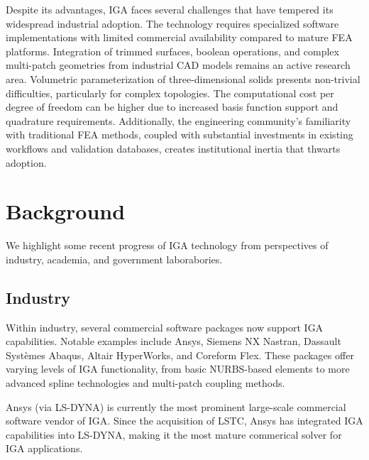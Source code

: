 \documentclass[12pt,report,justified]{SANDreport}
\begin{document}
Despite its advantages, IGA faces several challenges that have tempered its widespread industrial adoption. The technology requires specialized software implementations with limited commercial availability compared to mature FEA platforms. Integration of trimmed surfaces, boolean operations, and complex multi-patch geometries from industrial CAD models remains an active research area. Volumetric parameterization of three-dimensional solids presents non-trivial difficulties, particularly for complex topologies. The computational cost per degree of freedom can be higher due to increased basis function support and quadrature requirements. Additionally, the engineering community's familiarity with traditional FEA methods, coupled with substantial investments in existing workflows and validation databases, creates institutional inertia that thwarts adoption.

%
%

\chapter{Background}

We highlight some recent progress of IGA technology from perspectives of industry, academia, and government laborabories.

\section{Industry}

Within industry, several commercial software packages now support IGA capabilities.  Notable examples include Ansys, Siemens NX Nastran, Dassault Systèmes Abaqus, Altair HyperWorks, and Coreform Flex.  These packages offer varying levels of IGA functionality, from basic NURBS-based elements to more advanced spline technologies and multi-patch coupling methods.

Ansys (via LS-DYNA) is currently the most prominent large-scale commercial software vendor of IGA.  Since the acquisition of LSTC, Ansys has integrated IGA capabilities into LS-DYNA, making it the most mature commerical solver for IGA applications.
\end{document}
